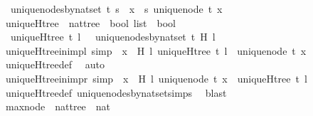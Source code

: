 \begin{isabellebody}
\ \ {\isachardoublequoteopen}unique{\isacharunderscore}nodes{\isacharunderscore}by{\isacharunderscore}nat{\isacharunderscore}set\ t\ s\ {\isacharequal}\ {\isacharparenleft}{\isasymforall}x\ {\isasymin}\ s{\isachardot}\ unique{\isacharunderscore}node\ t\ x{\isacharparenright}{\isachardoublequoteclose}\isanewline
\ \ \isanewline
{}\isamarkupfalse%
\ uniqueH{\isacharunderscore}tree\ {\isacharcolon}{\isacharcolon}\ {\isachardoublequoteopen}nattree\ {\isasymRightarrow}\ bool\ list\ {\isasymRightarrow}\ bool{\isachardoublequoteclose}\ \isanewline
\ \ {\isachardoublequoteopen}uniqueH{\isacharunderscore}tree\ t\ l\ {\isacharequal}\ \ unique{\isacharunderscore}nodes{\isacharunderscore}by{\isacharunderscore}nat{\isacharunderscore}set\ t\ {\isacharparenleft}H\ l{\isacharparenright}{\isachardoublequoteclose}\ \ \ \ \isanewline
\isanewline
{}\isamarkupfalse%
\ uniqueH{\isacharunderscore}tree{\isacharunderscore}in{\isacharunderscore}imp{\isacharunderscore}l\ {\isacharbrackleft}simp{\isacharbrackright}{\isacharcolon}\ {\isachardoublequoteopen}{\isasymforall}\ x\ {\isasymin}\ H\ l{\isachardot}\ uniqueH{\isacharunderscore}tree\ t\ l\ {\isasymlongrightarrow}\ unique{\isacharunderscore}node\ t\ x{\isachardoublequoteclose}\isanewline
%
\isadelimproof
\ \ %
\endisadelimproof
%
\isatagproof
{}\isamarkupfalse%
\ uniqueH{\isacharunderscore}tree{\isacharunderscore}def\ \isamarkupfalse%
\ auto%
\endisatagproof
{\isafoldproof}%
%
\isadelimproof
\ \isanewline
%
\endisadelimproof
\ \ \ \ \isanewline
{}\isamarkupfalse%
\ uniqueH{\isacharunderscore}tree{\isacharunderscore}in{\isacharunderscore}imp{\isacharunderscore}r\ {\isacharbrackleft}simp{\isacharbrackright}{\isacharcolon}\ {\isachardoublequoteopen}{\isacharparenleft}{\isasymforall}\ x\ {\isasymin}\ H\ l{\isachardot}\ unique{\isacharunderscore}node\ t\ x{\isacharparenright}\ {\isasymlongrightarrow}\ uniqueH{\isacharunderscore}tree\ t\ l{\isachardoublequoteclose}\isanewline
%
\isadelimproof
\ \ %
\endisadelimproof
%
\isatagproof
{}\isamarkupfalse%
\ uniqueH{\isacharunderscore}tree{\isacharunderscore}def\ unique{\isacharunderscore}nodes{\isacharunderscore}by{\isacharunderscore}nat{\isacharunderscore}set{\isachardot}simps\ \isamarkupfalse%
\ blast%
\endisatagproof
{\isafoldproof}%
%
\isadelimproof
\isanewline
%
\endisadelimproof
\ \ \ \ \isanewline
{}\isamarkupfalse%
\ max{\isacharunderscore}node\ {\isacharcolon}{\isacharcolon}\ {\isachardoublequoteopen}nattree\ {\isasymRightarrow}\ nat{\isachardoublequoteclose}\ \isanewline

\end{isabellebody}
